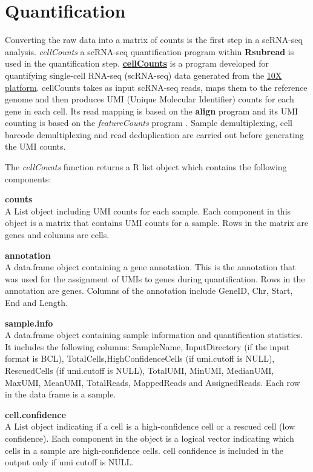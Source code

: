 \documentclass[
]{book}
\begin{document}
\hypertarget{quantification}{%
\section{Quantification}\label{quantification}}

Converting the raw data into a matrix of counts is the first step in a scRNA-seq analysis. \emph{cellCounts} a scRNA-seq quantification program within \textbf{Rsubread} is used in the quantification step. \href{https://rdrr.io/bioc/Rsubread/man/cellCounts.html}{\textbf{cellCounts}} is a program developed for quantifying single-cell RNA-seq (scRNA-seq) data generated from the \href{https://www.10xgenomics.com/products/single-cell-gene-expression}{10X platform}. cellCounts takes as input scRNA-seq reads, maps them to the reference genome and then produces UMI (Unique Molecular Identifier) counts for each gene in each cell. Its read mapping is based on the \textbf{align} program \citep{Rsubread2019, liao2013subread} and its UMI counting is based on the \emph{featureCounts} program \citep{liao2013featurecounts}. Sample demultiplexing, cell barcode demultiplexing and read deduplication are carried out before generating the UMI counts.

The \emph{cellCounts} function returns a R list object which contains the following components:

\textbf{counts}\\
A List object including UMI counts for each sample. Each component in this object is a matrix that contains UMI counts for a sample. Rows in the matrix are genes and columns are cells.

\textbf{annotation}\\
A data.frame object containing a gene annotation. This is the annotation that was used for the assignment of UMIs to genes during quantification. Rows in the annotation are genes. Columns of the annotation include GeneID, Chr, Start, End and Length.

\textbf{sample.info}\\
A data.frame object containing sample information and quantification statistics. It includes the following columns: SampleName, InputDirectory (if the input format is BCL), TotalCells,HighConfidenceCells (if umi.cutoff is NULL), RescuedCells (if umi.cutoff is NULL), TotalUMI, MinUMI, MedianUMI, MaxUMI, MeanUMI, TotalReads, MappedReads and AssignedReads. Each row in the data frame is a sample.

\textbf{cell.confidence}\\
A List object indicating if a cell is a high-confidence cell or a rescued cell (low confidence). Each component in the object is a logical vector indicating which cells in a sample are high-confidence cells. cell confidence is included in the output only if umi cutoff is NULL.
\end{document}
